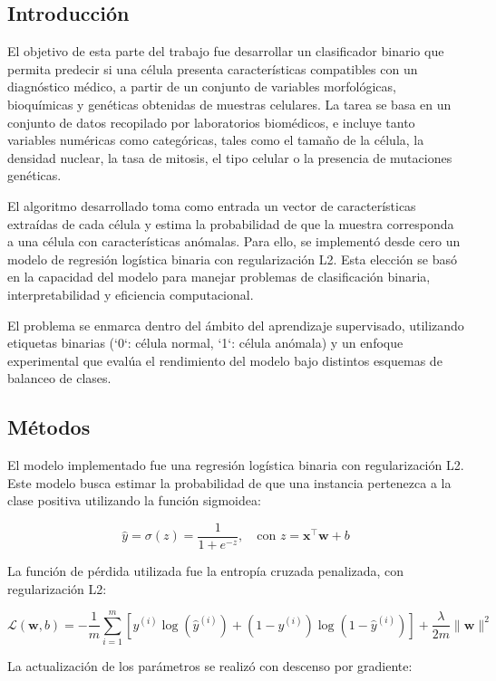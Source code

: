 \documentclass[11pt]{article}
\begin{document}
\subsection{Introducción}
El objetivo de esta parte del trabajo fue desarrollar un clasificador binario que permita predecir si una célula presenta características compatibles con un diagnóstico médico, a partir de un conjunto de variables morfológicas, bioquímicas y genéticas obtenidas de muestras celulares. La tarea se basa en un conjunto de datos recopilado por laboratorios biomédicos, e incluye tanto variables numéricas como categóricas, tales como el tamaño de la célula, la densidad nuclear, la tasa de mitosis, el tipo celular o la presencia de mutaciones genéticas.

El algoritmo desarrollado toma como entrada un vector de características extraídas de cada célula y estima la probabilidad de que la muestra corresponda a una célula con características anómalas. Para ello, se implementó desde cero un modelo de regresión logística binaria con regularización L2. Esta elección se basó en la capacidad del modelo para manejar problemas de clasificación binaria, interpretabilidad y eficiencia computacional.

El problema se enmarca dentro del ámbito del aprendizaje supervisado, utilizando etiquetas binarias (`0`: célula normal, `1`: célula anómala) y un enfoque experimental que evalúa el rendimiento del modelo bajo distintos esquemas de balanceo de clases.


\subsection{Métodos}

El modelo implementado fue una regresión logística binaria con regularización L2. Este modelo busca estimar la probabilidad de que una instancia pertenezca a la clase positiva utilizando la función sigmoidea:

\[
\hat{y} = \sigma(z) = \frac{1}{1 + e^{-z}}, \quad \text{con } z = \mathbf{x}^\top \mathbf{w} + b
\]

La función de pérdida utilizada fue la entropía cruzada penalizada, con regularización L2:

\[
\mathcal{L}(\mathbf{w}, b) = -\frac{1}{m} \sum_{i=1}^{m} \left[ y^{(i)} \log(\hat{y}^{(i)}) + (1 - y^{(i)}) \log(1 - \hat{y}^{(i)}) \right] + \frac{\lambda}{2m} \|\mathbf{w}\|^2
\]

La actualización de los parámetros se realizó con descenso por gradiente:
\end{document}
